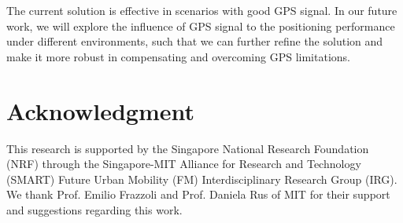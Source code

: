 \documentclass[letterpaper, 10 pt, conference]{ieeeconf}
\begin{document}
The current solution is effective in scenarios with good GPS signal. In our future work, we will  explore the influence of GPS signal to the positioning performance under different environments, such that we can further refine the solution and make it more robust in compensating and overcoming GPS limitations.

\section*{Acknowledgment}
This research is supported by the Singapore National Research Foundation (NRF) through the Singapore-MIT Alliance for Research and Technology (SMART) Future Urban Mobility (FM) Interdisciplinary Research Group (IRG). We thank Prof. Emilio Frazzoli and Prof. Daniela Rus of MIT for their support and suggestions regarding this work.


\end{document}
